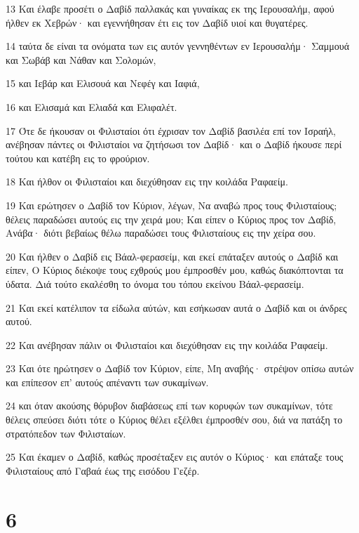\par 13 Και έλαβε προσέτι ο Δαβίδ παλλακάς και γυναίκας εκ της Ιερουσαλήμ, αφού ήλθεν εκ Χεβρών· και εγεννήθησαν έτι εις τον Δαβίδ υιοί και θυγατέρες.
\par 14 ταύτα δε είναι τα ονόματα των εις αυτόν γεννηθέντων εν Ιερουσαλήμ· Σαμμουά και Σωβάβ και Νάθαν και Σολομών,
\par 15 και Ιεβάρ και Ελισουά και Νεφέγ και Ιαφιά,
\par 16 και Ελισαμά και Ελιαδά και Ελιφαλέτ.
\par 17 Ότε δε ήκουσαν οι Φιλισταίοι ότι έχρισαν τον Δαβίδ βασιλέα επί τον Ισραήλ, ανέβησαν πάντες οι Φιλισταίοι να ζητήσωσι τον Δαβίδ· και ο Δαβίδ ήκουσε περί τούτου και κατέβη εις το φρούριον.
\par 18 Και ήλθον οι Φιλισταίοι και διεχύθησαν εις την κοιλάδα Ραφαείμ.
\par 19 Και ερώτησεν ο Δαβίδ τον Κύριον, λέγων, Να αναβώ προς τους Φιλισταίους; θέλεις παραδώσει αυτούς εις την χειρά μου; Και είπεν ο Κύριος προς τον Δαβίδ, Ανάβα· διότι βεβαίως θέλω παραδώσει τους Φιλισταίους εις την χείρα σου.
\par 20 Και ήλθεν ο Δαβίδ εις Βάαλ-φερασείμ, και εκεί επάταξεν αυτούς ο Δαβίδ και είπεν, Ο Κύριος διέκοψε τους εχθρούς μου έμπροσθέν μου, καθώς διακόπτονται τα ύδατα. Διά τούτο εκαλέσθη το όνομα του τόπου εκείνου Βάαλ-φερασείμ.
\par 21 Και εκεί κατέλιπον τα είδωλα αύτών, και εσήκωσαν αυτά ο Δαβίδ και οι άνδρες αυτού.
\par 22 Και ανέβησαν πάλιν οι Φιλισταίοι και διεχύθησαν εις την κοιλάδα Ραφαείμ.
\par 23 Και ότε ηρώτησεν ο Δαβίδ τον Κύριον, είπε, Μη αναβής· στρέψον οπίσω αυτών και επίπεσον επ' αυτούς απέναντι των συκαμίνων.
\par 24 και όταν ακούσης θόρυβον διαβάσεως επί των κορυφών των συκαμίνων, τότε θέλεις σπεύσει διότι τότε ο Κύριος θέλει εξέλθει έμπροσθέν σου, διά να πατάξη το στρατόπεδον των Φιλισταίων.
\par 25 Και έκαμεν ο Δαβίδ, καθώς προσέταξεν εις αυτόν ο Κύριος· και επάταξε τους Φιλισταίους από Γαβαά έως της εισόδου Γεζέρ.

\chapter{6}

